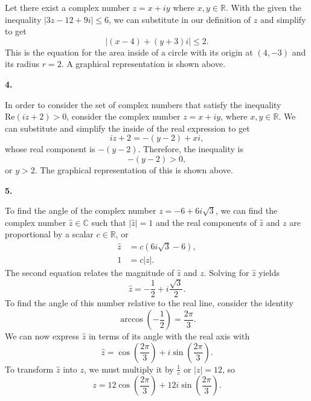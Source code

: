 \documentclass{article}
\newcommand{\qnumber}[1]{
\vspace{0.5cm}
\noindent
\textbf{#1.}
\vspace{4mm}
}
\begin{document}
Let there exist a complex number $z=x+iy$ where $x, y \in \mathbb{R}$. With the given the inequality $|3z-12+9i|\leq 6$, we can substitute in our definition of $z$ and simplify to get
\[
    |(x-4) + (y+3)i|\leq 2.
\]
This is the equation for the area inside of a circle with its origin at $(4, -3)$ and its radius $r=2$. A graphical representation is shown above.

\qnumber{4}

\begin{figure}[h]
    \centering

    
\end{figure}

In order to consider the set of complex numbers that satisfy the inequality $\text{Re}(iz+2)>0$, consider the complex number $z=x+iy$, where $x,y\in\mathbb{R}$. We can substitute and simplify the inside of the real expression to get
\[
    iz+2=-(y-2)+xi,
\]
whose real component is $-(y-2)$. Therefore, the inequality is
\[
    -(y-2)>0,
\] 
or $y>2$. The graphical representation of this is shown above.

\newpage

\qnumber{5}

To find the angle of the complex number $z=-6+6i\sqrt{3}$, we can find the complex number $\hat{z} \in \mathbb{C}$ such that $|\hat{z}|=1$ and the real components of $\hat{z}$ and $z$ are proportional by a scalar $c\in\mathbb{R}$, or
\[
\begin{split}
    \hat{z}&=c(6i\sqrt{3}-6), \\
    1&=c|z|.
\end{split}
\]
The second equation relates the magnitude of $\hat{z}$ and $z$. Solving for $\hat{z}$ yields
\[
    \hat{z}=-\frac{1}{2}+i\frac{\sqrt{3}}{2}.
\]  
To find the angle of this number relative to the real line, consider the identity 
\[
    \arccos (-\frac{1}{2})=\frac{2\pi}{3}.    
\]
We can now express $\hat{z}$ in terms of its angle with the real axis with
\[
    \hat{z}=\cos (\frac{2\pi}{3}) + i\sin (\frac{2\pi}{3}).
\]
To transform $\hat{z}$ into $z$, we must multiply it by $\frac{1}{c}$ or $|z|=12$, so
\[
    z=12\cos (\frac{2\pi}{3}) + 12i\sin (\frac{2\pi}{3}).
\]
\end{document}
